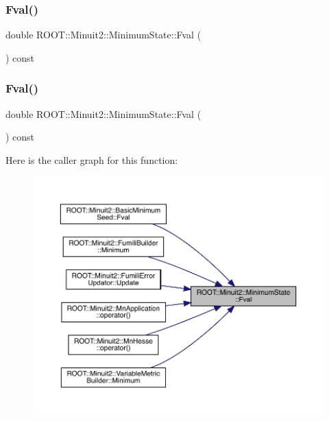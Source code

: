 \subsubsection{\texorpdfstring{Fval()}{Fval()}\hspace{0.1cm}{\footnotesize\ttfamily [1/2]}}
{\footnotesize\ttfamily double R\+O\+O\+T\+::\+Minuit2\+::\+Minimum\+State\+::\+Fval (\begin{DoxyParamCaption}{ }\end{DoxyParamCaption}) const\hspace{0.3cm}{\ttfamily [inline]}}

\mbox{\label{classROOT_1_1Minuit2_1_1MinimumState_aad936fc04cd24c5b769748b93ded0ab9}} 
\subsubsection{\texorpdfstring{Fval()}{Fval()}\hspace{0.1cm}{\footnotesize\ttfamily [2/2]}}
{\footnotesize\ttfamily double R\+O\+O\+T\+::\+Minuit2\+::\+Minimum\+State\+::\+Fval (\begin{DoxyParamCaption}{ }\end{DoxyParamCaption}) const\hspace{0.3cm}{\ttfamily [inline]}}

Here is the caller graph for this function\+:\nopagebreak
\begin{figure}[H]
\begin{center}
\leavevmode
\includegraphics[width=350pt]{db/dcd/classROOT_1_1Minuit2_1_1MinimumState_aad936fc04cd24c5b769748b93ded0ab9_icgraph}
\end{center}
\end{figure}
\mbox{\label{classROOT_1_1Minuit2_1_1MinimumState_a08a0d667e1f89522a29c49c9c02e642d}} 
